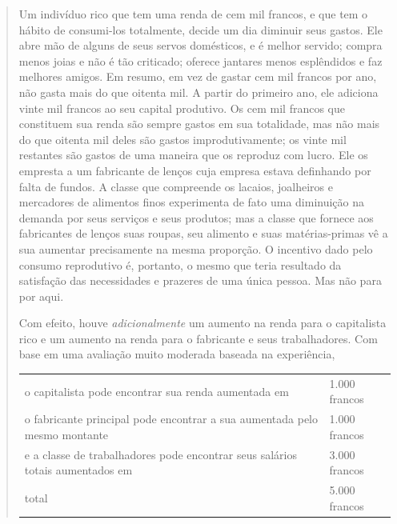 \documentclass[12pt]{article}
\begin{document}
\begin{quote}
Um indivíduo rico que tem uma renda de cem mil francos, e que tem o hábito de consumi-los totalmente, decide um dia diminuir seus gastos. Ele abre mão de alguns de seus servos domésticos, e é melhor servido; compra menos joias e não é tão criticado; oferece jantares menos esplêndidos e faz melhores amigos. Em resumo, em vez de gastar cem mil francos por ano, não gasta mais do que oitenta mil. A partir do primeiro ano, ele adiciona vinte mil francos ao seu capital produtivo. Os cem mil francos que constituem sua renda são sempre gastos em sua totalidade, mas não mais do que oitenta mil deles são gastos improdutivamente; os vinte mil restantes são gastos de uma maneira que os reproduz com lucro. Ele os empresta a um fabricante de lenços cuja empresa estava definhando por falta de fundos. A classe que compreende os lacaios, joalheiros e mercadores de alimentos finos experimenta de fato uma diminuição na demanda por seus serviços e seus produtos; mas a classe que fornece aos fabricantes de lenços suas roupas, seu alimento e suas matérias-primas vê a sua aumentar precisamente na mesma proporção. O incentivo dado pelo consumo reprodutivo é, portanto, o mesmo que teria resultado da satisfação das necessidades e prazeres de uma única pessoa. Mas não para por aqui.

Com efeito, houve \textit{adicionalmente} um aumento na renda para o capitalista rico e um aumento na renda para o fabricante e seus trabalhadores. Com base em uma avaliação muito moderada baseada na experiência,

\begin{center}
\begin{tabular}{ll}
o capitalista pode encontrar sua renda aumentada em & 1.000 francos \\
o fabricante principal pode encontrar a sua aumentada pelo mesmo montante & 1.000 francos \\
e a classe de trabalhadores pode encontrar seus salários totais aumentados em & 3.000 francos \\
\hline
total & 5.000 francos
\end{tabular}
\end{center}


\end{quote}
\end{document}
